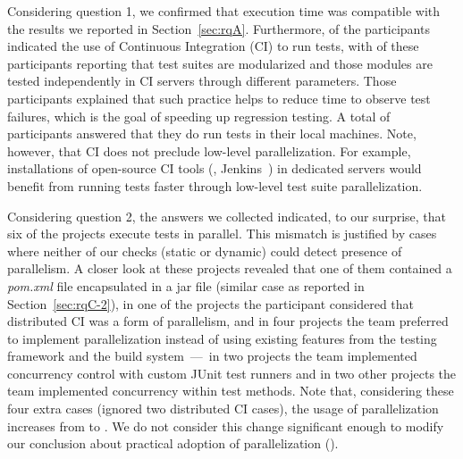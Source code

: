 \documentclass[10pt,journal,compsoc]{IEEEtran}
\begin{document}
Considering question 1, we confirmed that execution time was
compatible with the results we reported in Section~\ref{sec:rqA}.
Furthermore, \emailsCI{} of the participants indicated the use of
Continuous Integration (CI) to run tests, with \emailsDistributed{} of
these participants reporting that test suites are modularized and
those modules are tested independently in CI servers through different
parameters.  Those participants explained that such practice helps to
reduce time to observe test failures, which is the goal of speeding up
regression testing.  A total of \emailsLocal{} participants answered
that they do run tests in their local machines.  Note, however, that
CI does not preclude low-level parallelization.  For example,
installations of open-source CI tools (\eg{}, Jenkins~\cite{jenkins})
in dedicated servers would benefit from running tests faster through
low-level test suite parallelization.

Considering question 2, the answers we collected indicated, to our
surprise, that six of the \emailsProjectsAnswered{} projects execute
tests in parallel.  This mismatch is justified by cases where neither
of our checks (static or dynamic) could detect presence of
parallelism.  A closer look at these projects revealed that one of
them contained a \emph{pom.xml} file encapsulated in a jar file
(similar case as reported in Section~\ref{sec:rqC-2}), in one of the
projects the participant considered that distributed CI was a form of
parallelism, and in four projects the team preferred to implement
parallelization instead of using existing features from the testing
framework and the build system~---~in two projects the team
implemented concurrency control with custom JUnit test runners and in
two other projects the team implemented concurrency within test
methods.  Note that, considering these four extra cases (ignored two
distributed CI cases), the usage of parallelization increases from
\percentParallel{} to \percentParallelUpdated{}.  We do not consider
this change significant enough to modify our conclusion about
practical adoption of parallelization (\numRQAdoptionOne{}).
\end{document}
